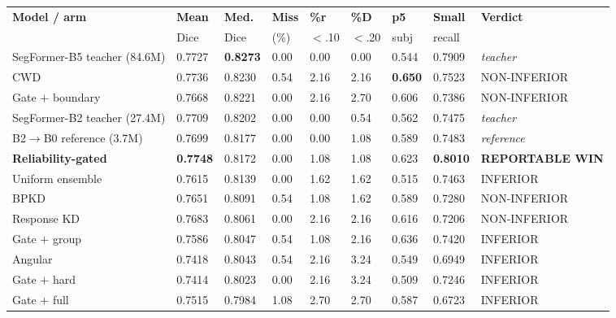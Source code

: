 \documentclass[11pt]{article}
\newcommand{\win}[1]{\textcolor{wingreen}{\textbf{#1}}}
\newcommand{\lose}[1]{\textcolor{losered}{#1}}
\begin{document}
\begin{center}\footnotesize
\setlength{\tabcolsep}{3pt}
\begin{tabular}{>{\raggedright\arraybackslash}p{3.5cm} m m m m m m m >{\raggedright\arraybackslash}p{3.0cm}}
\toprule
\textbf{Model / arm} & \textbf{Mean} & \textbf{Med.} & \textbf{Miss} & \textbf{\%r} &
\textbf{\%D} & \textbf{p5} & \textbf{Small} & \textbf{Verdict} \\
 & Dice & Dice & (\%) & $<$.10 & $<$.20 & subj & recall & \\
\midrule
SegFormer-B5 teacher (84.6M) & 0.7727 & \textbf{0.8273} & 0.00 & 0.00 & 0.00 & 0.544 & 0.7909 &
  \emph{teacher} \\
CWD                          & 0.7736 & 0.8230 & 0.54 & 2.16 & 2.16 & \textbf{0.650} & 0.7523 &
  NON-INFERIOR \\
Gate $+$ boundary            & 0.7668 & 0.8221 & 0.00 & 2.16 & 2.70 & 0.606 & 0.7386 &
  NON-INFERIOR \\
SegFormer-B2 teacher (27.4M) & 0.7709 & 0.8202 & 0.00 & 0.00 & 0.54 & 0.562 & 0.7475 &
  \emph{teacher} \\
B2$\to$B0 reference (3.7M)   & 0.7699 & 0.8177 & 0.00 & 0.00 & 1.08 & 0.589 & 0.7483 &
  \emph{reference} \\
\win{Reliability-gated}      & \win{0.7748} & 0.8172 & 0.00 & 1.08 & 1.08 & 0.623 &
  \win{0.8010} & \win{REPORTABLE WIN} \\
Uniform ensemble             & 0.7615 & 0.8139 & 0.00 & 1.62 & 1.62 & \lose{0.515} & 0.7463 &
  \lose{INFERIOR} \\
BPKD                         & 0.7651 & 0.8091 & 0.54 & 1.08 & 1.62 & 0.589 & 0.7280 &
  NON-INFERIOR \\
Response KD                  & 0.7683 & 0.8061 & 0.00 & 2.16 & 2.16 & 0.616 & 0.7206 &
  NON-INFERIOR \\
Gate $+$ group               & 0.7586 & 0.8047 & 0.54 & 1.08 & 2.16 & 0.636 & 0.7420 &
  \lose{INFERIOR} \\
Angular                      & 0.7418 & 0.8043 & 0.54 & 2.16 & 3.24 & 0.549 & \lose{0.6949} &
  \lose{INFERIOR} \\
Gate $+$ hard                & \lose{0.7414} & 0.8023 & 0.00 & 2.16 & 3.24 & \lose{0.509} &
  0.7246 & \lose{INFERIOR} \\
Gate $+$ full                & 0.7515 & \lose{0.7984} & \lose{1.08} & 2.70 & 2.70 & 0.587 &
  \lose{0.6723} & \lose{INFERIOR} \\
\bottomrule
\end{tabular}
\end{center}
\end{document}

